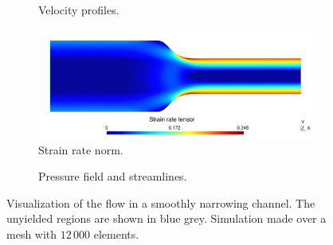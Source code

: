 \documentclass[11 pt]{report}
\begin{document}
\begin{figure}
    \centering
    \begin{subfigure}[t]{\textwidth}
        
        \caption{Velocity profiles.}
        \label{fig:smoothNeckV}
    \end{subfigure}
    \begin{subfigure}[t]{\textwidth}
        \includegraphics[width=\textwidth]{../figures/neck_smooth_strain.pdf}
        \caption{Strain rate norm.}
        \label{fig:smoothNeckS}
    \end{subfigure}
    \begin{subfigure}[t]{\textwidth}
        
        \caption{Pressure field and streamlines.}
        \label{fig:smoothNeckP}
    \end{subfigure}
    \caption{Visualization of the flow in a smoothly narrowing channel. The unyielded regions are shown in blue grey. Simulation made over a mesh with $12\,000$ elements.}
    \label{fig:smoothNeck}
\end{figure}
\end{document}
